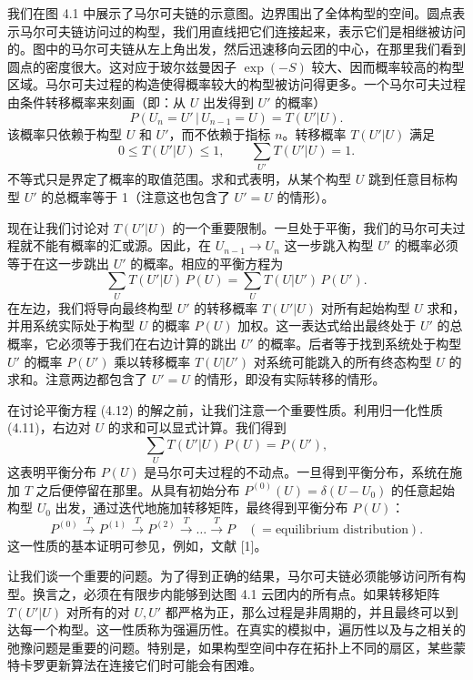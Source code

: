 我们在图 4.1 中展示了马尔可夫链的示意图。边界围出了全体构型的空间。圆点表示马尔可夫链访问过的构型，我们用直线把它们连接起来，表示它们是相继被访问的。图中的马尔可夫链从左上角出发，然后迅速移向云团的中心，在那里我们看到圆点的密度很大。这对应于玻尔兹曼因子 $\exp(-S)$ 较大、因而概率较高的构型区域。马尔可夫过程的构造使得概率较大的构型被访问得更多。一个马尔可夫过程由条件转移概率来刻画（即：从 $U$ 出发得到 $U'$ 的概率）
\begin{equation}
  P(U_n = U' \,|\, U_{n-1} = U) = T(U'|U).
\end{equation}
该概率只依赖于构型 $U$ 和 $U'$，而不依赖于指标 $n$。转移概率 $T(U'|U)$ 满足
\begin{equation}
  0 \leq T(U'|U) \leq 1, \qquad \sum_{U'} T(U'|U) = 1 .
\end{equation}
不等式只是界定了概率的取值范围。求和式表明，从某个构型 $U$ 跳到任意目标构型 $U'$ 的总概率等于 1（注意这也包含了 $U' = U$ 的情形）。

现在让我们讨论对 $T(U'|U)$ 的一个重要限制。一旦处于平衡，我们的马尔可夫过程就不能有概率的汇或源。因此，在 $U_{n-1} \to U_n$ 这一步跳入构型 $U'$ 的概率必须等于在这一步跳出 $U'$ 的概率。相应的平衡方程为
\begin{equation}
  \sum_{U} T(U'|U)\,P(U) = \sum_{U} T(U|U')\,P(U').
\end{equation}
在左边，我们将导向最终构型 $U'$ 的转移概率 $T(U'|U)$ 对所有起始构型 $U$ 求和，并用系统实际处于构型 $U$ 的概率 $P(U)$ 加权。这一表达式给出最终处于 $U'$ 的总概率，它必须等于我们在右边计算的跳出 $U'$ 的概率。后者等于找到系统处于构型 $U'$ 的概率 $P(U')$ 乘以转移概率 $T(U|U')$ 对系统可能跳入的所有终态构型 $U$ 的求和。注意两边都包含了 $U' = U$ 的情形，即没有实际转移的情形。

在讨论平衡方程 (4.12) 的解之前，让我们注意一个重要性质。利用归一化性质 (4.11)，右边对 $U$ 的求和可以显式计算。我们得到
\begin{equation}
  \sum_{U} T(U'|U)\,P(U) = P(U'),
\end{equation}
这表明平衡分布 $P(U)$ 是马尔可夫过程的不动点。一旦得到平衡分布，系统在施加 $T$ 之后便停留在那里。从具有初始分布 $P^{(0)}(U) = \delta(U - U_0)$ 的任意起始构型 $U_0$ 出发，通过迭代地施加转移矩阵，最终得到平衡分布 $P(U)$：
\begin{equation}
  P^{(0)} \xrightarrow{T} P^{(1)} \xrightarrow{T} P^{(2)} \xrightarrow{T} \ldots \xrightarrow{T} P
  \quad (= \text{equilibrium distribution}).
\end{equation}
这一性质的基本证明可参见，例如，文献 [1]。

让我们谈一个重要的问题。为了得到正确的结果，马尔可夫链必须能够访问所有构型。换言之，必须在有限步内能够到达图 4.1 云团内的所有点。如果转移矩阵 $T(U'|U)$ 对所有的对 $U, U'$ 都严格为正，那么过程是非周期的，并且最终可以到达每一个构型。这一性质称为强遍历性。在真实的模拟中，遍历性以及与之相关的弛豫问题是重要的问题。特别是，如果构型空间中存在拓扑上不同的扇区，某些蒙特卡罗更新算法在连接它们时可能会有困难。

